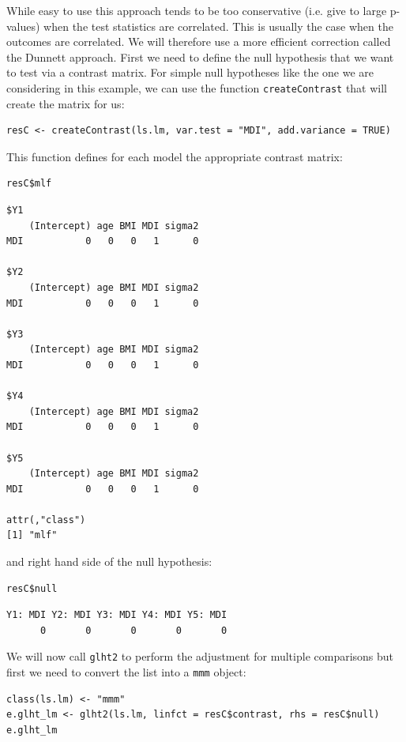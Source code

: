 \documentclass[12pt]{article}
\begin{document}
While easy to use this approach tends to be too conservative
(i.e. give to large p-values) when the test statistics are
correlated. This is usually the case when the outcomes are
correlated. We will therefore use a more efficient correction called
the Dunnett approach. First we need to define the null hypothesis
that we want to test via a contrast matrix. For simple null hypotheses
like the one we are considering in this example, we can use the
function \texttt{createContrast} that will create the matrix for us:
\lstset{language=r,label= ,caption= ,captionpos=b,numbers=none}
\begin{lstlisting}
resC <- createContrast(ls.lm, var.test = "MDI", add.variance = TRUE)
\end{lstlisting}

This function defines for each model the appropriate contrast matrix:
\lstset{language=r,label= ,caption= ,captionpos=b,numbers=none}
\begin{lstlisting}
resC$mlf
\end{lstlisting}
\begin{verbatim}
$Y1
    (Intercept) age BMI MDI sigma2
MDI           0   0   0   1      0

$Y2
    (Intercept) age BMI MDI sigma2
MDI           0   0   0   1      0

$Y3
    (Intercept) age BMI MDI sigma2
MDI           0   0   0   1      0

$Y4
    (Intercept) age BMI MDI sigma2
MDI           0   0   0   1      0

$Y5
    (Intercept) age BMI MDI sigma2
MDI           0   0   0   1      0

attr(,"class")
[1] "mlf"
\end{verbatim}

and right hand side of the null hypothesis:
\lstset{language=r,label= ,caption= ,captionpos=b,numbers=none}
\begin{lstlisting}
resC$null
\end{lstlisting}

\begin{verbatim}
Y1: MDI Y2: MDI Y3: MDI Y4: MDI Y5: MDI 
      0       0       0       0       0
\end{verbatim}

We will now call \texttt{glht2} to perform the adjustment for multiple
comparisons but first we need to convert the list into a \texttt{mmm} object:
\lstset{language=r,label= ,caption= ,captionpos=b,numbers=none}
\begin{lstlisting}
class(ls.lm) <- "mmm"
e.glht_lm <- glht2(ls.lm, linfct = resC$contrast, rhs = resC$null)
e.glht_lm
\end{lstlisting}
\end{document}

